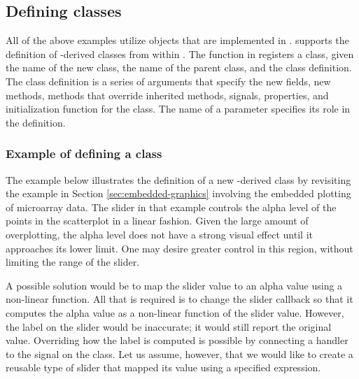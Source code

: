 \documentclass[article,shortnames]{jss}
\begin{document}
\subsection[Defining GObject classes]{Defining  classes}

All of the above examples utilize objects that are implemented in
.
 supports the definition of -derived classes
from within
.  The  function in  registers a 
class, given the name of the new class, the name of the parent class,
and the class 
definition. The class definition is a series of arguments that specify
the new fields, new methods, 
methods that override inherited methods,
 signals, properties, and
initialization function
for the class. The name of a parameter specifies its role in the
definition.

\subsubsection{Example of defining a class}
\label{sec:class-example}

The example below illustrates the definition of a new
-derived
class by revisiting the example in Section \ref{sec:embedded-graphics}
involving the embedded plotting of 
microarray data.
The slider in that example controls the alpha level of the
points in the scatterplot in a linear fashion. Given the large amount
of
overplotting, the alpha level does not have a strong visual effect
until it
approaches its lower limit. One may desire greater control in this
region,
without limiting the range of the slider. 

A possible solution would be to map the slider value to an alpha value
using a non-linear function. All that is required is to change the
slider callback so that it computes the alpha value as a non-linear
function of the slider value. However, the label on the slider would
be inaccurate; it would still report the original value.  Overriding
how the label is computed is possible by connecting a handler
to the
 signal on the  class. Let us
assume,
however, that we would like to create a reusable type of slider that
mapped its value using a specified  expression.
\end{document}
